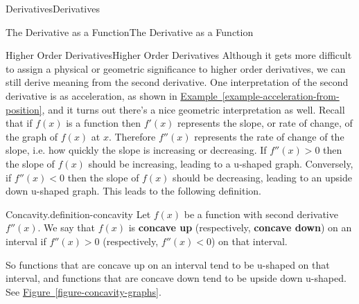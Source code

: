\documentclass[10pt,]{book}
\newcommand{\terminology}[1]{\textbf{#1}}
\numberwithin{equation}{section}
\begin{document}
\begin{chapterptx}{Derivatives}{}{Derivatives}{}{}
\begin{sectionptx}{The Derivative as a Function}{}{The Derivative as a Function}{}{}
\begin{subsectionptx}{Higher Order Derivatives}{}{Higher Order Derivatives}{}{}
Although it gets more difficult to assign a physical or geometric significance to higher order derivatives, we can still derive meaning from the second derivative. One interpretation of the second derivative is as acceleration, as shown in \hyperref[example-acceleration-from-position]{Example~\ref{example-acceleration-from-position}}, and it turns out there's a nice geometric interpretation as well. Recall that if \(f(x)\) is a function then \(f'(x)\) represents the slope, or rate of change, of the graph of \(f(x)\) at \(x\). Therefore \(f''(x)\) represents the rate of change of the slope, i.e. how quickly the slope is increasing or decreasing. If \(f''(x) >0\) then the slope of \(f(x)\) should be increasing, leading to a u-shaped graph. Conversely, if \(f''(x) <0\) then the slope of \(f(x)\) should be decreasing, leading to an upside down u-shaped graph. This leads to the following definition.%
\begin{definition}{Concavity.}{definition-concavity}%
\hypertarget{p-121}{}%
Let \(f(x)\) be a function with second derivative \(f''(x)\). We say that \(f(x)\) is \terminology{concave up} (respectively, \terminology{concave down}) on an interval if \(f''(x)>0\) (respectively, \(f''(x) <0\)) on that interval.%
\end{definition}
\hypertarget{p-122}{}%
So functions that are concave up on an interval tend to be u-shaped on that interval, and functions that are concave down tend to be upside down u-shaped. See \hyperref[figure-concavity-graphs]{Figure~\ref{figure-concavity-graphs}}.%
\begin{figure}
\centering
\begin{sidebyside}{2}{0}{0}{0}%
\begin{sbspanel}{0.5}%
\end{sbspanel}%
\begin{sbspanel}{0.5}%
\resizebox{\linewidth}{!}{{
\begin{tikzpicture}

\end{tikzpicture}}}
\end{sbspanel}
\end{sidebyside}
\end{figure}
\end{subsectionptx}
\end{sectionptx}
\end{chapterptx}
\end{document}
